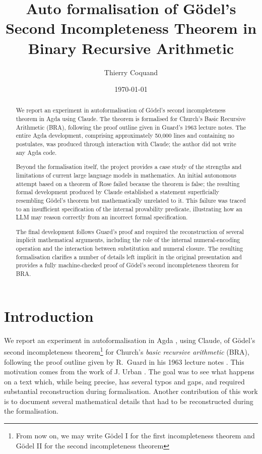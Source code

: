 \documentclass[11pt]{article}
\title{Auto formalisation of G\"odel's Second Incompleteness Theorem in Binary Recursive Arithmetic}
\author{Thierry Coquand}
\affil{Computer Science and Engineering Department,
University of Gothenburg, Sweden,
\href{mailto:coquand@chalmers.se}{coquand@chalmers.se}
}
\date{\today}
\theoremstyle{plain}
\theoremstyle{definition}
\theoremstyle{remark}
\begin{document}
\maketitle

\begin{abstract}
  We report an experiment in autoformalisation of Gödel's second incompleteness
  theorem in Agda using Claude. The theorem is formalised for Church's Basic Recursive
  Arithmetic (BRA), following the proof outline given in Guard's 1963 lecture notes. The
  entire Agda development, comprising approximately 50,000 lines and containing no
  postulates, was produced through interaction with Claude; the author did not write
  any Agda code.

  Beyond the formalisation itself, the project provides a case study of the strengths
  and limitations of current large language models in mathematics. An initial
  autonomous attempt based on a theorem of Rose failed because the theorem is false;
  the resulting formal development produced by Claude established a statement
  superficially resembling Gödel's theorem but mathematically unrelated to it. This
  failure was traced to an insufficient specification of the internal provability
  predicate, illustrating how an LLM may reason correctly from an incorrect formal
  specification.

  The final development follows Guard's proof and required the reconstruction of several
  implicit mathematical arguments, including the role of the internal numeral-encoding
  operation and the
  interaction between substitution and numeral closure. The
  resulting formalisation clarifies a number of details left implicit in the original
  presentation and provides a fully machine-checked proof of Gödel's second
  incompleteness theorem for BRA.
\end{abstract}




\section*{Introduction}

We report an experiment in autoformalisation in Agda \cite{17Provers},
using Claude,
of G\"odel's second incompleteness theorem\footnote{From now on, we may write G\"odel I for the first incompleteness
theorem and G\"odel II for the second incompleteness theorem} for Church's \emph{basic
recursive arithmetic} (BRA), following the proof outline given by
R.~Guard in his 1963 lecture notes \cite{Guard63}. This motivation comes from
the work of J. Urban \cite{Urban26}. The goal was to see what happens
on a text which, while being precise, has several typos and gaps, and
required substantial reconstruction during formalisation.
Another contribution of this work is to document several mathematical details that had to be reconstructed
during the formalisation.
\end{document}
